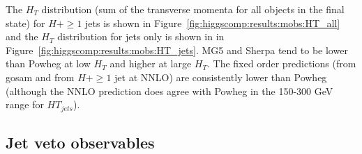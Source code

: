 The $H_T$ distribution (sum of the transverse momenta for all objects
in the final state) for $H+\ge1$ jets is shown in
Figure~\ref{fig:higgscomp:results:mobs:HT_all} and the $H_T$
distribution for jets only is shown in in
Figure~\ref{fig:higgscomp:results:mobs:HT_jets}. 
MG5 and Sherpa tend to be lower than Powheg at low $H_T$ and higher at
large $H_T$. The fixed order predictions (from gosam and from $H+\ge1$
jet at NNLO) are consistently lower than Powheg (although the NNLO
prediction does agree with Powheg in the 150-300 GeV range for
$HT_{jets}$).



\clearpage
\subsection{Jet veto observables}
\label{sec:hjetscomp:results:jvobs}

